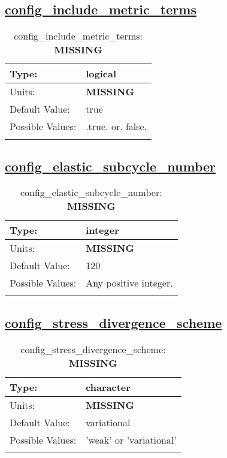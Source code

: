 \subsection[config\_include\_metric\_terms]{\hyperref[sec:nm_tab_velocity_solver]{config\_include\_metric\_terms}}
\label{subsec:nm_sec_config_include_metric_terms}
\begin{center}
\begin{longtable}{| p{2.0in} || p{4.0in} |}
    \hline
    Type: & logical \\
    \hline
    Units: & {\bf \color{red} MISSING} \\
    \hline
    Default Value: & true \\
    \hline
    Possible Values: & .true. or. false. \\
    \hline
    \caption{config\_include\_metric\_terms: {\bf \color{red} MISSING}}
\end{longtable}
\end{center}
\subsection[config\_elastic\_subcycle\_number]{\hyperref[sec:nm_tab_velocity_solver]{config\_elastic\_subcycle\_number}}
\label{subsec:nm_sec_config_elastic_subcycle_number}
\begin{center}
\begin{longtable}{| p{2.0in} || p{4.0in} |}
    \hline
    Type: & integer \\
    \hline
    Units: & {\bf \color{red} MISSING} \\
    \hline
    Default Value: & 120 \\
    \hline
    Possible Values: & Any positive integer. \\
    \hline
    \caption{config\_elastic\_subcycle\_number: {\bf \color{red} MISSING}}
\end{longtable}
\end{center}
\subsection[config\_stress\_divergence\_scheme]{\hyperref[sec:nm_tab_velocity_solver]{config\_stress\_divergence\_scheme}}
\label{subsec:nm_sec_config_stress_divergence_scheme}
\begin{center}
\begin{longtable}{| p{2.0in} || p{4.0in} |}
    \hline
    Type: & character \\
    \hline
    Units: & {\bf \color{red} MISSING} \\
    \hline
    Default Value: & variational \\
    \hline
    Possible Values: & 'weak' or 'variational' \\
    \hline
    \caption{config\_stress\_divergence\_scheme: {\bf \color{red} MISSING}}
\end{longtable}
\end{center}

